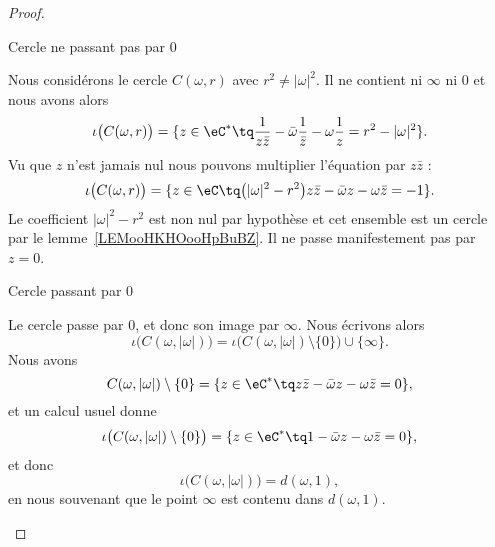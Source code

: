 \begin{proof}
\begin{subproof}
        \item[Cercle ne passant pas par \( 0\)]


            Nous considérons le cercle \( C(\omega,r)\) avec \( r^2\neq | \omega |^2\). Il ne contient ni \( \infty\) ni \( 0\) et nous avons alors
            \begin{equation}
                \iota\big( C(\omega,r) \big)=\{ z\in \eC^*\tq \frac{1}{ z\bar z }-\bar\omega\frac{1}{ \bar z }-\omega\frac{1}{ z }=r^2-| \omega |^2 \}.
            \end{equation}
            Vu que \( z\) n'est jamais nul nous pouvons multiplier l'équation par \( z\bar z\) :
            \begin{equation}
                \iota\big( C(\omega,r) \big)=\{ z\in \eC\tq \big( | \omega |^2-r^2 \big)z\bar z-\bar\omega z-\omega\bar z=-1 \}.
            \end{equation}
            Le coefficient \( | \omega |^2-r^2\) est non nul par hypothèse et cet ensemble est un cercle par le lemme~\ref{LEMooHKHOooHpBuBZ}. Il ne passe manifestement pas par \( z=0\).


        \item[Cercle passant par \( 0\)]

            Le cercle passe par \( 0\), et donc son image par \( \infty\). Nous écrivons alors
            \begin{equation}
                \iota\big( C(\omega,| \omega |) \big)=\iota\big( C(\omega,| \omega |)\setminus\{ 0 \} \big)\cup\{ \infty \}.
            \end{equation}
            Nous avons
            \begin{equation}
                C(\omega,| \omega |)\setminus \{ 0 \} =\{ z\in \eC^*\tq z\bar z-\bar \omega z-\omega\bar z=0 \},
            \end{equation}
            et un calcul usuel donne
            \begin{equation}
                \iota\big( C(\omega,| \omega |)\setminus \{ 0 \}  \big)=\{ z\in \eC^*\tq 1-\bar \omega z-\omega\bar z=0 \},
            \end{equation}
            et donc
            \begin{equation}
                \iota\big( C(\omega,| \omega |) \big)=d(\omega,1),
            \end{equation}
            en nous souvenant que le point \( \infty\) est contenu dans \( d(\omega,1)\).

    \end{subproof}
\end{proof}


